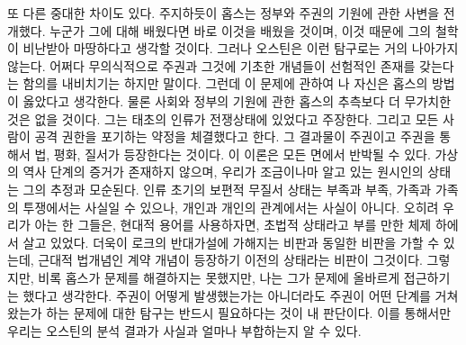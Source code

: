 또 다른 중대한 차이도 있다.
주지하듯이 홉스는 정부와 주권의 기원에 관한 사변을 전개했다.
누군가 그에 대해 배웠다면 바로 이것을 배웠을 것이며,
이것 때문에 그의 철학이 비난받아 마땅하다고 생각할 것이다.
그러나 오스틴은 이런 탐구로는 거의 나아가지 않는다.
어쩌다 무의식적으로 주권과 그것에 기초한 개념들이 선험적인 존재를
갖는다는 함의를 내비치기는 하지만 말이다.
그런데
이 문제에 관하여 나 자신은 홉스의 방법이 옳았다고 생각한다.
물론 사회와 정부의 기원에 관한 홉스의 추측보다 더 무가치한 것은 없을 것이다.
그는 태초의 인류가 전쟁상태에 있었다고 주장한다.
그리고 모든 사람이 공격 권한을 포기하는 약정을 체결했다고 한다.
그 결과물이 주권이고 주권을 통해서 법, 평화, 질서가 등장한다는 것이다.
이 이론은 모든 면에서 반박될 수 있다.
가상의 역사 단계의 증거가 존재하지 않으며,
우리가 조금이나마 알고 있는 원시인의 상태는 그의 추정과 모순된다.
인류 초기의 보편적 무질서 상태는 부족과 부족, 가족과 가족의 투쟁에서는
사실일 수 있으나, 개인과 개인의 관계에서는 사실이 아니다.
오히려 우리가 아는 한 그들은, 현대적 용어를 사용하자면,
초법적 상태라고 부를 만한 체제 하에서 살고 있었다.
더욱이 로크의 반대가설에 가해지는 비판과 동일한 비판을 가할 수 있는데,
근대적 법개념인 계약 개념이 등장하기 이전의 상태라는 비판이 그것이다.
그렇지만,
비록 홉스가 문제를 해결하지는 못했지만,
나는 그가 문제에 올바르게 접근하기는 했다고 생각한다.
주권이 어떻게 발생했는가는 아니더라도
주권이 어떤 단계를 거쳐왔는가 하는 문제에 대한 탐구는
반드시 필요하다는 것이 내 판단이다.
이를 통해서만 우리는
오스틴의 분석 결과가 사실과 얼마나 부합하는지 알 수 있다.

